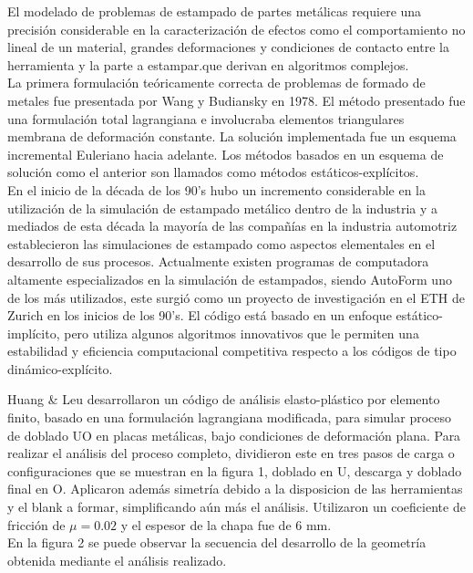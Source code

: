 El modelado de problemas de estampado de partes metálicas requiere una precisión considerable en la caracterización 
de efectos como el comportamiento no lineal de un material, grandes deformaciones y condiciones de contacto entre la
herramienta y la parte a estampar.que derivan  en algoritmos complejos.\cite{banabic2000}\\

La primera formulación teóricamente correcta de problemas de formado de metales fue presentada por Wang y Budiansky 
\cite{wang1978} en 1978. El método presentado fue una formulación total lagrangiana e involucraba elementos triangulares membrana de 
deformación constante. La solución implementada fue un esquema incremental Euleriano hacia adelante. Los métodos basados en un 
esquema de solución como el anterior son llamados como métodos estáticos-explícitos.\\

En el inicio de la década de los 90's hubo un incremento considerable en la utilización de la simulación de estampado 
metálico dentro de la industria y a mediados de esta década la mayoría de las compañías en la industria automotriz 
establecieron las simulaciones de estampado como aspectos elementales en el desarrollo de sus procesos. 
Actualmente existen programas de computadora altamente especializados en la simulación de estampados, siendo AutoForm 
uno de los más utilizados, este surgió como un proyecto de investigación en el ETH de Zurich en los inicios de los 90's. 
El código está basado en un enfoque estático-implícito, pero utiliza algunos algoritmos innovativos que le permiten 
una estabilidad y eficiencia computacional competitiva respecto a los códigos de tipo dinámico-explícito.\cite{banabic2000}

Huang & Leu \cite{huang1995} desarrollaron un código de análisis elasto-plástico por elemento finito, basado en una formulación 
lagrangiana modificada, para simular proceso de doblado UO en placas metálicas, bajo condiciones de deformación 
plana. Para realizar el análisis del proceso completo, dividieron este en tres pasos de carga o configuraciones 
que se muestran en la figura 1, doblado en U, descarga y doblado final en O. Aplicaron además simetría debido a la 
disposicion de las herramientas y el blank a formar, simplificando aún más el análisis. Utilizaron un coeficiente 
de fricción de $\mu = 0.02$ y el espesor de la chapa fue de 6 mm.\\

En la figura 2 se puede observar la secuencia del desarrollo de la geometría obtenida mediante el análisis 
realizado. 

